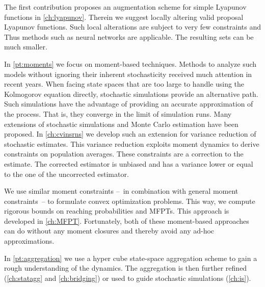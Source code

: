 The first contribution proposes an augmentation scheme for simple
Lyapunov functions in \autoref{ch:lyapunov}.
Therein we suggest locally altering valid proposal Lyapunov functions.
Such local alterations are subject to very few constraints and
Thus methods such as neural networks are applicable.
The resulting sets can be much smaller.

In \autoref{pt:moments} we focus on moment-based techniques.
Methods to analyze such models without ignoring their inherent
stochasticity received much attention in recent years.
When facing state spaces that are too large to handle using the
Kolmogorov equation directly, stochastic simulations
\parencite{gillespie1977exact} provide an alternative path.
Such simulations have the advantage of providing an accurate
approximation of the process.
That is, they converge in the limit of simulation runs.
Many extensions of stochastic simulations and Monte Carlo estimation
have been proposed.
In \autoref{ch:cvinsrns} we develop such an extension for variance
reduction of stochastic estimates.
This variance reduction exploits moment dynamics to derive
constraints on population averages.
These constraints are a correction to the estimate.
The corrected estimator is unbiased and has a variance lower or equal
to the one of the uncorrected estimator.

We use similar moment constraints  --~in combination with general
moment constraints~-- to formulate convex optimization problems.
This way, we compute rigorous bounds on reaching probabilities and \aclp{MFPT}.
This approach is developed in \autoref{ch:MFPT}.
Fortunately, both of these moment-based approaches can do without any
moment closures
and thereby avoid any ad-hoc approximations.

In \autoref{pt:aggregation} we use a hyper cube state-space
aggregation scheme to gain a rough understanding of the dynamics.
The aggregation is then further refined (\autoref{ch:statagg} and
\autoref{ch:bridging}) or used to guide stochastic simulations
(\autoref{ch:is}).

